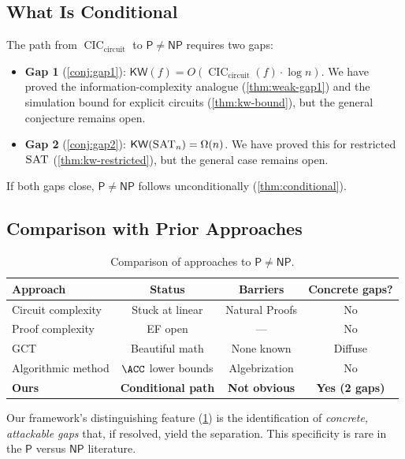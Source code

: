 \documentclass[11pt]{article}
\theoremstyle{plain}
\theoremstyle{definition}
\newcommand{\CIC}{\operatorname{CIC}}
\newcommand{\CICcirc}{\CIC_{\text{circuit}}}
\newcommand{\SAT}{\textsc{SAT}}
\newcommand{\KW}{\mathsf{KW}}
\newcommand{\Pclass}{\mathsf{P}}
\newcommand{\NP}{\mathsf{NP}}
\begin{document}
\subsection{What Is Conditional}

The path from $\CICcirc$ to $\Pclass \neq \NP$ requires two gaps:

\begin{itemize}
    \item \textbf{Gap 1} (\cref{conj:gap1}): $\KW(f) = O(\CICcirc(f) \cdot \log n)$. We have proved the information-complexity analogue (\cref{thm:weak-gap1}) and the simulation bound for explicit circuits (\cref{thm:kw-bound}), but the general conjecture remains open.
    \item \textbf{Gap 2} (\cref{conj:gap2}): $\KW(\SAT_n) = \Omega(n)$. We have proved this for restricted $\SAT$ (\cref{thm:kw-restricted}), but the general case remains open.
\end{itemize}

If both gaps close, $\Pclass \neq \NP$ follows unconditionally (\cref{thm:conditional}).

\subsection{Comparison with Prior Approaches}

\begin{table}[htbp]
\centering
\caption{Comparison of approaches to $\Pclass \neq \NP$.}
\label{tab:comparison}
\begin{tabular}{@{}lccc@{}}
\toprule
\textbf{Approach} & \textbf{Status} & \textbf{Barriers} & \textbf{Concrete gaps?} \\
\midrule
Circuit complexity & Stuck at linear & Natural Proofs & No \\
Proof complexity & EF open & --- & No \\
GCT & Beautiful math & None known & Diffuse \\
Algorithmic method & $\ACC$ lower bounds & Algebrization & No \\
\textbf{Ours} & \textbf{Conditional path} & \textbf{Not obvious} & \textbf{Yes (2 gaps)} \\
\bottomrule
\end{tabular}
\end{table}

Our framework's distinguishing feature (\cref{tab:comparison}) is the identification of \emph{concrete, attackable gaps} that, if resolved, yield the separation. This specificity is rare in the $\Pclass$ versus $\NP$ literature.
\end{document}
